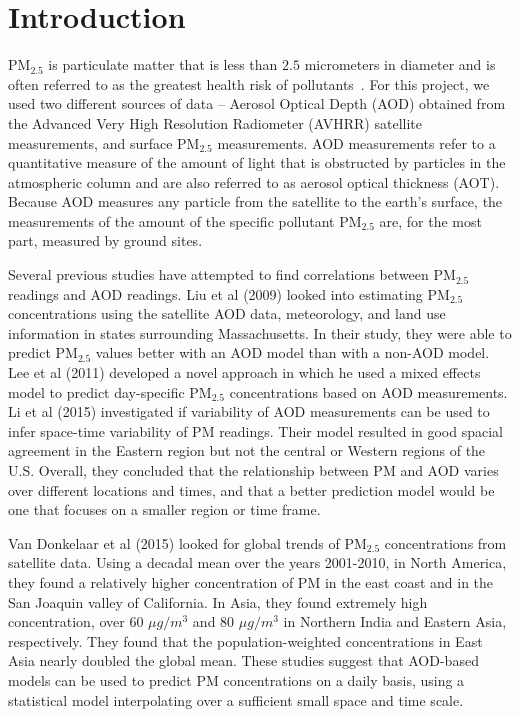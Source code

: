 \documentclass[10pt]{article}
\newcommand{\kelly}[1]{{\color{blue}{Kelly: {#1}}}}
\begin{document}
\section{Introduction}

PM$_{2.5}$ is particulate matter that is less than $2.5$ micrometers in diameter and is often referred to as the greatest health risk of pollutants~\cite{epa}. For this project, we used two different sources of data -- Aerosol Optical Depth (AOD) obtained from the Advanced Very High Resolution Radiometer (AVHRR) satellite measurements, and surface PM$_{2.5}$ measurements. AOD measurements refer to a quantitative measure of the amount of light that is obstructed by particles in the atmospheric column and are also referred to as aerosol optical thickness (AOT). Because AOD measures any particle from the satellite to the earth's surface, the measurements of the amount of the specific pollutant PM$_{2.5}$ are, for the most part, measured by ground sites.

Several previous studies have attempted to find correlations between PM$_{2.5}$ readings and AOD readings. Liu et al (2009) looked into estimating PM$_{2.5}$ concentrations using the satellite AOD data, meteorology, and land use information in states surrounding Massachusetts.\cite{Liu} In their study, they were able to predict PM$_{2.5}$ values better with an AOD model than with a non-AOD model. Lee et al (2011) developed a novel approach in which he used a mixed effects model to predict day-specific PM$_{2.5}$ concentrations based on AOD measurements.\cite{lee} Li et al (2015) investigated if variability of AOD measurements can be used to infer space-time variability of PM readings. Their model resulted in good spacial agreement in the Eastern region but not the central or Western regions of the U.S. Overall, they concluded that the relationship between PM and AOD varies over different locations and times, and that a better prediction model would be one that focuses on a smaller region or time frame. 

\kelly{Is this next paragraph useful?}
Van Donkelaar et al (2015) looked for global trends of PM$_{2.5}$ concentrations from satellite data. Using a decadal mean over the years 2001-2010, in North America, they found a relatively higher concentration of PM in the east coast and in the San Joaquin valley of California. In Asia, they found extremely high concentration, over 60 $\mu g/m^3$ and 80 $\mu g/m^3$ in Northern India and Eastern Asia, respectively. They found that the population-weighted concentrations in East Asia nearly doubled the global mean.
These studies suggest that AOD-based models can be used to predict PM concentrations on a daily basis, using a statistical model interpolating over a sufficient small space and time scale.
\end{document}
